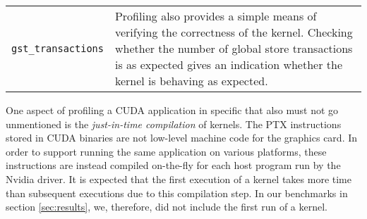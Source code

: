 \begin{center}
\begin{longtable}{p{} p{}}
    \\
	\newpage
    \multicolumn{2}{c}{\textbf{Verification}} \\
    \hline
    \hline
    \raggedright \texttt{gst\_\allowbreak transactions} & Profiling also provides a simple means of verifying the correctness of the kernel. Checking whether the number of global store transactions is as expected gives an indication whether the kernel is behaving as expected. \\
    \hline
\end{longtable}
\end{center}

One aspect of profiling a CUDA application in specific that also must not go unmentioned is the \emph{just-in-time compilation} of kernels. The PTX instructions stored in CUDA binaries are not low-level machine code for the graphics card. In order to support running the same application on various platforms, these instructions are instead compiled on-the-fly for each host program run by the Nvidia driver. It is expected that the first execution of a kernel takes more time than subsequent executions due to this compilation step. In our benchmarks in section \ref{sec:results}, we, therefore, did not include the first run of a kernel.